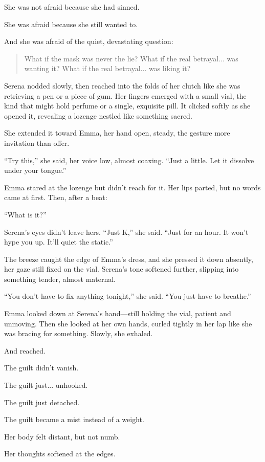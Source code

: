 She was not afraid because she had sinned. 

She was afraid because she still wanted to.

And she was afraid of the quiet, devastating question:

\begin{quote}
What if the mask was never the lie?
What if the real betrayal... was wanting it?
What if the real betrayal... was liking it?
\end{quote}

Serena nodded slowly, then reached into the folds of her clutch like she was retrieving a pen 
or a piece of gum. Her fingers emerged with a small vial, the kind that might hold perfume or a single, 
exquisite pill. It clicked softly as she opened it, revealing a lozenge nestled like something sacred.

She extended it toward Emma, her hand open, steady, the gesture more invitation than offer.

``Try this,'' she said, her voice low, almost coaxing. ``Just a little. Let it dissolve under your tongue.''

Emma stared at the lozenge but didn’t reach for it. Her lips parted, but no words came at first. Then, 
after a beat:

``What is it?''

Serena’s eyes didn’t leave hers. ``Just K,'' she said. ``Just for an hour. It won’t hype you up. It’ll 
quiet the static.''

The breeze caught the edge of Emma’s dress, and she pressed it down absently, her gaze still fixed 
on the vial. Serena’s tone softened further, slipping into something tender, almost maternal.

``You don’t have to fix anything tonight,'' she said. ``You just have to breathe.''

Emma looked down at Serena’s hand—still holding the vial, patient and unmoving. Then she looked at 
her own hands, curled tightly in her lap like she was bracing for something. Slowly, she exhaled.

And reached.

The guilt didn’t vanish. 

The guilt just... unhooked. 

The guilt just detached. 

The guilt became a mist instead of a weight. 

Her body felt distant, but not numb. 

Her thoughts softened at the edges. 

